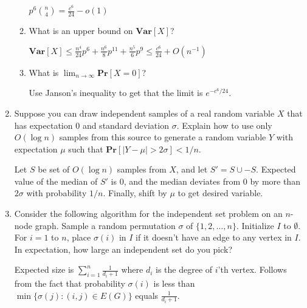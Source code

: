 \documentclass[11pt]{article}
\def\Pr{\mathbf{Pr}}
\def\Exp{\mathbf{Exp}}
\def\Var{\mathbf{Var}}
\def\Pr{\mathbf{Pr}}
\def\Exp{\mathbf{Exp}}
\def\Var{\mathbf{Var}}
\begin{document}
\begin{enumerate}
\begin{enumerate}
	$p^6 {n \choose 4}= \frac{c^6}{24}-o(1)$ 
	\item  What is an upper bound on $\Var[X]$?
	
	$\Var[X] \leq \frac{n^4}{24} p^6 + \frac{n^6}{8} p^11 + \frac{n^5}{6}p^9 \leq \frac{c^6}{24} + O(n^{-1})$
	\item  What is $\lim_{n\to \infty} \Pr[X = 0]$? 
	
	Use Janson's inequality to get that the limit is $e^{-c^6/24}$. 
\end{enumerate}
\vspace{0.5ex}

\item
Suppose you can draw independent samples of a real random variable $X$ that has expectation $0$ and standard deviation $\sigma$. Explain how to use only $O(\log n)$ samples from this source to generate a random variable $Y$ with expectation $\mu$ such that $\Pr[|Y-\mu| > 2 \sigma] < 1/n$. 

Let $S$ be set of $O(\log n)$ samples from $X$, and let $S' = S \cup -S$. Expected value of the median of $S'$ is $0$, and the median deviates from $0$ by more than $2\sigma$ with probability $1/n$. Finally, shift by $\mu$ to get desired variable.
\vspace{0.5ex}
\item 
Consider the following algorithm for the independent set problem on an $n$-node graph. Sample a random permutation $\sigma$ of $\{1,2,\ldots,n\}$. Initialize $I$ to $\emptyset$.
For $i=1$ to $n$, place $\sigma(i)$ in $I$ if it doesn't have an edge to any vertex in $I$.  In expectation, how large an independent set do you pick?

Expected size is $\sum_{i=1}^n \frac{1}{d_i+1}$ where $d_i$ is the degree of $i$'th vertex. Follows from the fact that probability $\sigma(i)$ is less than $\min\{\sigma(j): (i,j) \in E(G)\}$ equals $\frac{1}{d_i+1}$. 


\end{enumerate}
\end{document}
